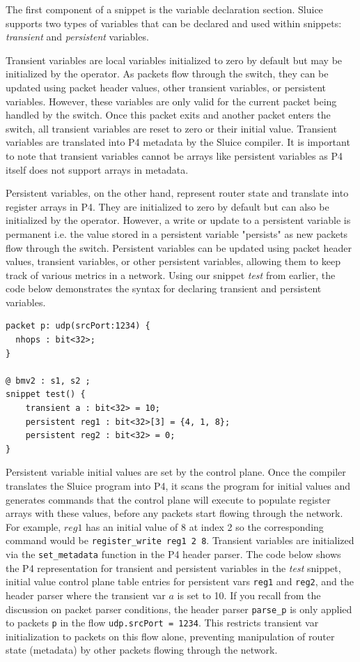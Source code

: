 \documentclass[12pt, oneside]{article}
\begin{document}
The first component of a snippet is the variable declaration section. Sluice supports two types of variables that can be declared and used within snippets: \textit{transient} and \textit{persistent} variables. 

Transient variables are local variables initialized to zero by default but may be initialized by the operator. As packets flow through the switch, they can be updated using packet header values, other transient variables, or persistent variables. However, these variables are only valid for the current packet being handled by the switch. Once this packet exits and another packet enters the switch, all transient variables are reset to zero or their initial value. Transient variables are translated into P4 metadata by the Sluice compiler. It is important to note that transient variables cannot be arrays like persistent variables as P4 itself does not support arrays in metadata. 

Persistent variables, on the other hand, represent router state and translate into register arrays in P4. They are initialized to zero by default but can also be initialized by the operator. However, a write or update to a persistent variable is permanent i.e. the value stored in a persistent variable "persists" as new packets flow through the switch. Persistent variables can be updated using packet header values, transient variables, or other persistent variables, allowing them to keep track of various metrics in a network. Using our snippet \textit{test} from earlier, the code below demonstrates the syntax for declaring transient and persistent variables. 

\begin{lstlisting}[basicstyle=\linespread{1.3}\scriptsize,  numberstyle=\tiny, frame=tlrb]
packet p: udp(srcPort:1234) {
  nhops : bit<32>;
}

@ bmv2 : s1, s2 ;
snippet test() {
    transient a : bit<32> = 10;
    persistent reg1 : bit<32>[3] = {4, 1, 8};
    persistent reg2 : bit<32> = 0;
}
\end{lstlisting}

Persistent variable initial values are set by the control plane. Once the compiler translates the Sluice program into P4, it scans the program for initial values and generates commands that the control plane will execute to populate register arrays with these values, before any packets start flowing through the network. For example, $reg1$ has an initial value of 8 at index 2 so the corresponding command would be \texttt{register\_write reg1 2 8}. Transient variables are initialized via the \texttt{set\_metadata} function in the P4 header parser. The code below shows the P4 representation for transient and persistent variables in the \textit{test} snippet, initial value control plane table entries for persistent vars \texttt{reg1} and \texttt{reg2}, and the header parser where the transient var $a$ is set to 10. If you recall from the discussion on packet parser conditions, the header parser \texttt{parse\_p} is only applied to packets \texttt{p} in the flow \texttt{udp.srcPort = 1234}. This restricts transient var initialization to packets on this flow alone, preventing manipulation of router state (metadata) by other packets flowing through the network.
\end{document}
